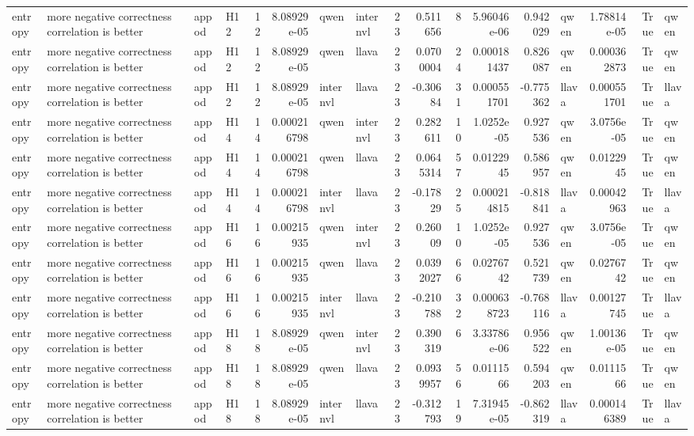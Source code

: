 \begin{longtable}{llllrrllrrrrrlrrl}
entropy & more negative correctness correlation is better & appod & H12 & 12 & 8.08929e-05 & qwen & internvl & 23 & 0.511656 & 8 & 5.96046e-06 & 0.942029 & qwen & 1.78814e-05 & True & qwen \\
entropy & more negative correctness correlation is better & appod & H12 & 12 & 8.08929e-05 & qwen & llava & 23 & 0.0700004 & 24 & 0.000181437 & 0.826087 & qwen & 0.000362873 & True & qwen \\
entropy & more negative correctness correlation is better & appod & H12 & 12 & 8.08929e-05 & internvl & llava & 23 & -0.30684 & 31 & 0.000551701 & -0.775362 & llava & 0.000551701 & True & llava \\
entropy & more negative correctness correlation is better & appod & H14 & 14 & 0.000216798 & qwen & internvl & 23 & 0.282611 & 10 & 1.0252e-05 & 0.927536 & qwen & 3.0756e-05 & True & qwen \\
entropy & more negative correctness correlation is better & appod & H14 & 14 & 0.000216798 & qwen & llava & 23 & 0.0645314 & 57 & 0.0122945 & 0.586957 & qwen & 0.0122945 & True & qwen \\
entropy & more negative correctness correlation is better & appod & H14 & 14 & 0.000216798 & internvl & llava & 23 & -0.17829 & 25 & 0.000214815 & -0.818841 & llava & 0.00042963 & True & llava \\
entropy & more negative correctness correlation is better & appod & H16 & 16 & 0.00215935 & qwen & internvl & 23 & 0.26009 & 10 & 1.0252e-05 & 0.927536 & qwen & 3.0756e-05 & True & qwen \\
entropy & more negative correctness correlation is better & appod & H16 & 16 & 0.00215935 & qwen & llava & 23 & 0.0392027 & 66 & 0.0276742 & 0.521739 & qwen & 0.0276742 & True & qwen \\
entropy & more negative correctness correlation is better & appod & H16 & 16 & 0.00215935 & internvl & llava & 23 & -0.210788 & 32 & 0.000638723 & -0.768116 & llava & 0.00127745 & True & llava \\
entropy & more negative correctness correlation is better & appod & H18 & 18 & 8.08929e-05 & qwen & internvl & 23 & 0.390319 & 6 & 3.33786e-06 & 0.956522 & qwen & 1.00136e-05 & True & qwen \\
entropy & more negative correctness correlation is better & appod & H18 & 18 & 8.08929e-05 & qwen & llava & 23 & 0.0939957 & 56 & 0.0111566 & 0.594203 & qwen & 0.0111566 & True & qwen \\
entropy & more negative correctness correlation is better & appod & H18 & 18 & 8.08929e-05 & internvl & llava & 23 & -0.312793 & 19 & 7.31945e-05 & -0.862319 & llava & 0.000146389 & True & llava \\

\end{longtable}
